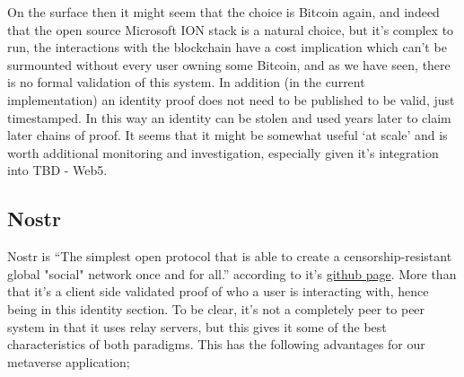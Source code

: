 On the surface then it might seem that the choice is Bitcoin again, and indeed that the open source Microsoft ION stack is a natural choice, but it's complex to run, the interactions with the blockchain have a cost implication which can't be surmounted without every user owning some Bitcoin, and as we have seen, there is no formal validation of this system. In addition (in the current implementation) an identity proof does not need to be published to be valid, just timestamped. In this way an identity can be stolen and used years later to claim later chains of proof. It seems that it might be somewhat useful `at scale' and is worth additional monitoring and investigation, especially given it's integration into TBD - Web5.
\subsection{Nostr}
Nostr is ``The simplest open protocol that is able to create a censorship-resistant global "social" network once and for all.'' according to it's \href{https://github.com/fiatjaf/nostr}{github page}. More than that it's a client side validated proof of who a user is interacting with, hence being in this identity section. To be clear, it's not a completely peer to peer system in that it uses relay servers, but this gives it some of the best characteristics of both paradigms. This has the following advantages for our metaverse application; 
